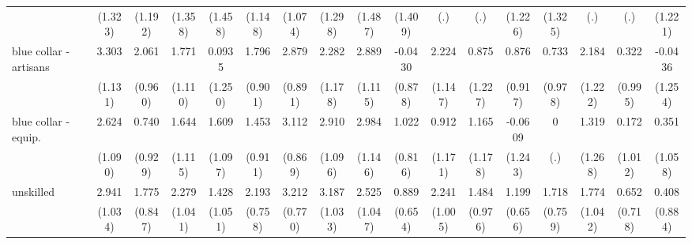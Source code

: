 {\begin{tabular}{l*{16}{c}}
                    &     (1.323)         &     (1.192)         &     (1.358)         &     (1.458)         &     (1.148)         &     (1.074)         &     (1.298)         &     (1.487)         &     (1.409)         &         (.)         &         (.)         &     (1.226)         &     (1.325)         &         (.)         &         (.)         &     (1.221)         \\
[1em]
blue collar - artisans&       3.303\sym{**} &       2.061\sym{*}  &       1.771         &      0.0935         &       1.796\sym{*}  &       2.879\sym{**} &       2.282         &       2.889\sym{**} &     -0.0430         &       2.224         &       0.875         &       0.876         &       0.733         &       2.184         &       0.322         &     -0.0436         \\
                    &     (1.131)         &     (0.960)         &     (1.110)         &     (1.250)         &     (0.901)         &     (0.891)         &     (1.178)         &     (1.115)         &     (0.878)         &     (1.147)         &     (1.227)         &     (0.917)         &     (0.978)         &     (1.222)         &     (0.995)         &     (1.254)         \\
[1em]
blue collar - equip.&       2.624\sym{*}  &       0.740         &       1.644         &       1.609         &       1.453         &       3.112\sym{***}&       2.910\sym{**} &       2.984\sym{**} &       1.022         &       0.912         &       1.165         &     -0.0609         &           0         &       1.319         &       0.172         &       0.351         \\
                    &     (1.090)         &     (0.929)         &     (1.115)         &     (1.097)         &     (0.911)         &     (0.869)         &     (1.096)         &     (1.146)         &     (0.816)         &     (1.171)         &     (1.178)         &     (1.243)         &         (.)         &     (1.268)         &     (1.012)         &     (1.058)         \\
[1em]
unskilled           &       2.941\sym{**} &       1.775\sym{*}  &       2.279\sym{*}  &       1.428         &       2.193\sym{**} &       3.212\sym{***}&       3.187\sym{**} &       2.525\sym{*}  &       0.889         &       2.241\sym{*}  &       1.484         &       1.199         &       1.718\sym{*}  &       1.774         &       0.652         &       0.408         \\
                    &     (1.034)         &     (0.847)         &     (1.041)         &     (1.051)         &     (0.758)         &     (0.770)         &     (1.033)         &     (1.047)         &     (0.654)         &     (1.005)         &     (0.976)         &     (0.656)         &     (0.759)         &     (1.042)         &     (0.718)         &     (0.884)         \\

\end{tabular}}
